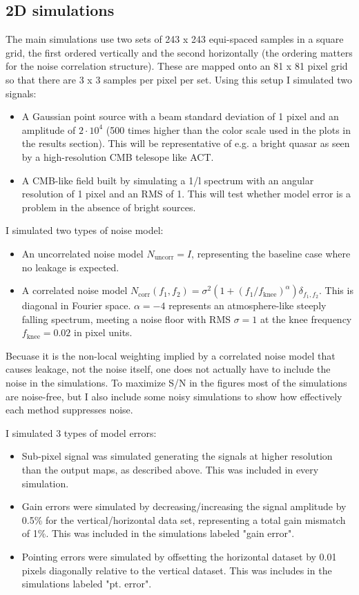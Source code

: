 \documentclass{article}
\begin{document}
\subsection{2D simulations}
The main simulations use two sets of 243 x 243 equi-spaced samples in a square grid,
the first ordered vertically and the second horizontally (the ordering matters for the
noise correlation structure). These are mapped onto an 81 x 81
pixel grid so that there are 3 x 3 samples per pixel per set. Using this setup I simulated
two signals:
\begin{itemize}
	\item A Gaussian point source with a beam standard deviation of 1 pixel and an
amplitude of $2\cdot 10^4$ (500 times higher than the color scale used in the plots in the
results section). This will be representative of e.g. a bright quasar as seen by a high-resolution
CMB telesope like ACT.
	\item A CMB-like field built by simulating a 1/l spectrum with an angular
resolution of 1 pixel and an RMS of 1. This will test whether model error
is a problem in the absence of bright sources.
\end{itemize}
I simulated two types of noise model:
\begin{itemize}
	\item An uncorrelated noise model $N_\textrm{uncorr} = I$, representing the baseline case
		where no leakage is expected.
	\item A correlated noise model $N_\textrm{corr}(f_1,f_2) = \sigma^2 (1 + (f_1/f_\textrm{knee})^\alpha) \delta_{f_1,f_2}$. This is diagonal in Fourier space. $\alpha = -4$ represents an atmosphere-like steeply falling spectrum, meeting a noise floor with RMS $\sigma=1$ at the knee frequency $f_\textrm{knee} = 0.02$ in pixel units.
\end{itemize}
Becuase it is the non-local weighting implied by a correlated noise model that causes leakage,
not the noise itself, one does not actually have to include the noise in the simulations.
To maximize S/N in the figures most of the simulations are noise-free, but I also include some noisy
simulations to show how effectively each method suppresses noise.

I simulated 3 types of model errors:
\begin{itemize}
	\item Sub-pixel signal was simulated generating the signals at higher resolution than the
		output maps, as described above. This was included in every simulation.
	\item Gain errors were simulated by decreasing/increasing the signal amplitude by
	0.5\% for the vertical/horizontal data set, representing a total gain mismatch of
	1\%. This was included in the simulations labeled "gain error".
	\item Pointing errors were simulated by offsetting the horizontal dataset by 0.01
		pixels diagonally relative to the vertical dataset. This was includes in the
	simulations labeled "pt. error".
\end{itemize}
\end{document}
